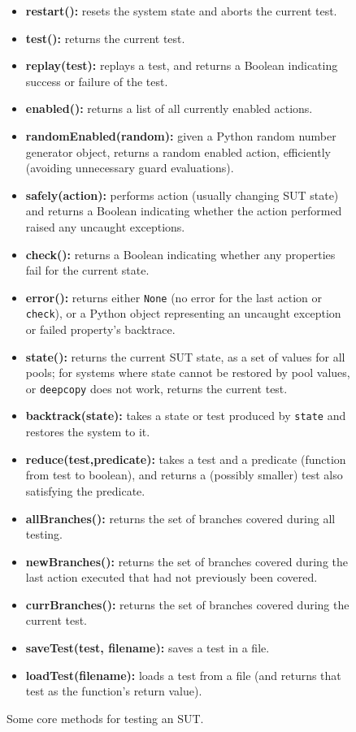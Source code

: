 \begin{figure}
{\scriptsize
\begin{itemize}
\item {\bf restart():}  resets the system state and aborts the current test. 
\item {\bf test():} returns the current test.
\item {\bf replay(test):} replays a test, and returns a Boolean indicating success or failure of the test.
\item {\bf enabled():} returns a list of all currently enabled actions.
\item {\bf randomEnabled(random):}  given a Python random number generator object, returns a random enabled action, efficiently (avoiding unnecessary guard evaluations).
\item {\bf safely(action):} performs action (usually changing SUT state)  and returns a Boolean indicating whether the action performed raised any uncaught exceptions. 
\item {\bf check():} returns a Boolean indicating whether any properties fail for the current state.
\item {\bf error():} returns either {\tt None} (no error for the last action or {\tt check}), or a Python object representing an uncaught exception or failed property's backtrace.
\item {\bf state():} returns the current SUT state, as a set of values for all pools; for systems where state cannot be restored by pool values, or {\tt deepcopy} does not work, returns the current test.
\item {\bf backtrack(state):} takes a state or test produced by {\tt state} and restores the system to it.
\item {\bf reduce(test,predicate):} takes a test and a predicate (function from test to boolean), and returns a (possibly smaller) test also satisfying the predicate.
\item {\bf allBranches():} returns the set of branches covered during all testing.
\item {\bf newBranches():} returns the set of branches covered during the last action executed that had not previously been covered.
\item {\bf currBranches():} returns the set of branches covered during the current test.
\item {\bf saveTest(test, filename):} saves a test in a file.
\item {\bf loadTest(filename):} loads a test from a file (and returns that test as the function's return value).
\end{itemize} 
}
\caption{Some core methods for testing an SUT.}
\label{methods}
\end{figure}

